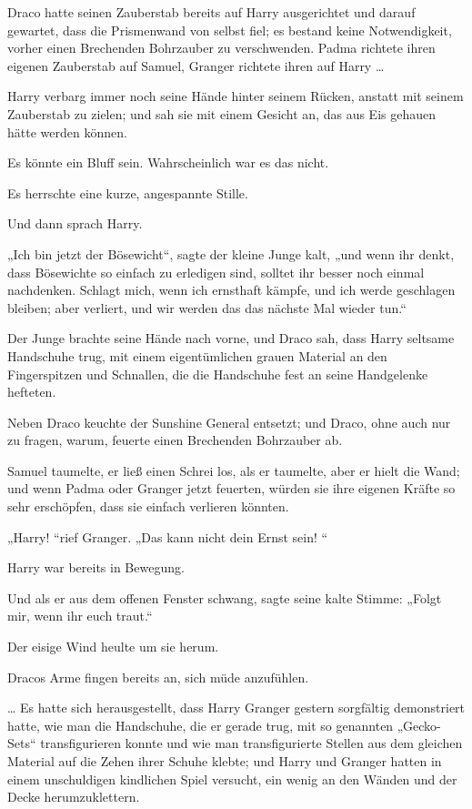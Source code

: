 {Draco hatte seinen Zauberstab bereits auf Harry ausgerichtet und darauf gewartet, dass die Prismenwand von selbst fiel; es bestand keine Notwendigkeit, vorher einen Brechenden Bohrzauber zu verschwenden. Padma richtete ihren eigenen Zauberstab auf Samuel, Granger richtete ihren auf Harry …

Harry verbarg immer noch seine Hände hinter seinem Rücken, anstatt mit seinem Zauberstab zu zielen; und sah sie mit einem Gesicht an, das aus Eis gehauen hätte werden können.

Es könnte ein Bluff sein. Wahrscheinlich war es das nicht.

Es herrschte eine kurze, angespannte Stille.

Und dann sprach Harry.

„Ich bin jetzt der Bösewicht“, sagte der kleine Junge kalt, „und wenn ihr denkt, dass Bösewichte so einfach zu erledigen sind, solltet ihr besser noch einmal nachdenken. Schlagt mich, wenn ich ernsthaft kämpfe, und ich werde geschlagen bleiben; aber verliert, und wir werden das das nächste Mal wieder tun.“

Der Junge brachte seine Hände nach vorne, und Draco sah, dass Harry seltsame Handschuhe trug, mit einem eigentümlichen grauen Material an den Fingerspitzen und Schnallen, die die Handschuhe fest an seine Handgelenke hefteten.

Neben Draco keuchte der Sunshine General entsetzt; und Draco, ohne auch nur zu fragen, warum, feuerte einen Brechenden Bohrzauber ab.

Samuel taumelte, er ließ einen Schrei los, als er taumelte, aber er hielt die Wand; und wenn Padma oder Granger jetzt feuerten, würden sie ihre eigenen Kräfte so sehr erschöpfen, dass sie einfach verlieren könnten.

„Harry! “rief Granger. „Das kann nicht dein Ernst sein! “

Harry war bereits in Bewegung.

Und als er aus dem offenen Fenster schwang, sagte seine kalte Stimme: „Folgt mir, wenn ihr euch traut.“

Der eisige Wind heulte um sie herum.

Dracos Arme fingen bereits an, sich müde anzufühlen.

… Es hatte sich herausgestellt, dass Harry Granger gestern sorgfältig demonstriert hatte, wie man die Handschuhe, die er gerade trug, mit so genannten „Gecko-Sets“ transfigurieren konnte und wie man transfigurierte Stellen aus dem gleichen Material auf die Zehen ihrer Schuhe klebte; und Harry und Granger hatten in einem unschuldigen kindlichen Spiel versucht, ein wenig an den Wänden und der Decke herumzuklettern.

}

